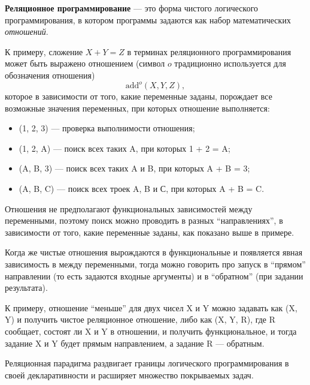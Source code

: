 {\bf Реляционное программирование} --- это форма чистого логического программирования,
в котором программы задаются как набор математических {\it отношений}.

К примеру, сложение $X + Y = Z$ в терминах реляционного программирования может
быть выражено отношением (символ $o$ традиционно используется для обозначения отношения)
\[ \text{add}^o (X, Y, Z), \]
которое в зависимости от того, какие переменные заданы, порождает
все возможные значения переменных, при которых отношение выполняется:
\begin{itemize}
\item {}(1, 2, 3) --- проверка выполнимости отношения;
\item {}(1, 2, A) --- поиск всех таких A, при которых 1 + 2 = A;
\item {}(A, B, 3) --- поиск всех таких A и B, при которых A + B = 3;
\item {}(A, B, C) --- поиск всех троек A, B и С, при которых A + B = C.
\end{itemize}

Отношения не предполагают функциональных зависимостей между переменными, поэтому
поиск можно проводить в разных ``направлениях'', в зависимости от того, какие переменные
заданы, как показано выше в примере.

Когда же чистые отношения вырождаются в функциональные и появляется
явная зависимость в между переменными, тогда можно говорить про запуск
в ``прямом'' направлении (то есть задаются входные аргументы) и в ``обратном''
(при задании результата).

К примеру, отношение ``меньше'' для двух чисел X и Y можно задавать как (X, Y) и
получить чистое реляционное отношение, либо
как (X, Y, R), где R сообщает, состоят ли X и Y в отношении,
и получить функциональное, и тогда задание X и Y будет прямым направлением, а задание R --- обратным.

Реляционная парадигма раздвигает границы логического программирования в своей декларативности
и расширяет множество покрываемых задач.

%
